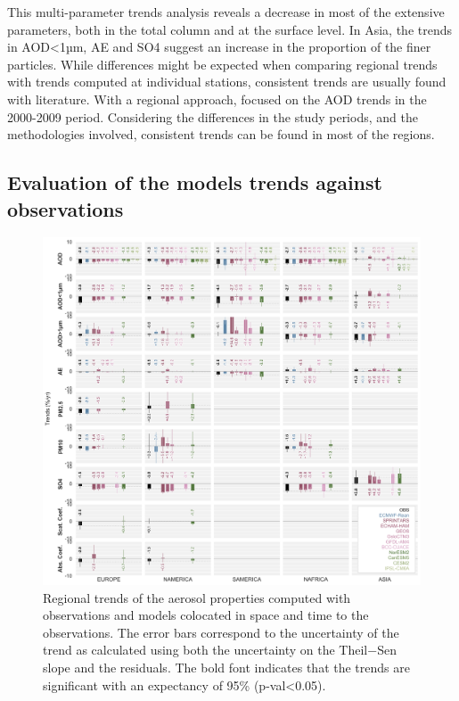 \documentclass[journal abbreviation, manuscript]{copernicus}
\begin{document}
\begin{itemize}
\end{itemize}

This multi-parameter trends analysis reveals a decrease in most of the extensive parameters, both in the total column and at the surface level. In Asia, the trends in AOD<1µm, AE and SO4 suggest an increase in the proportion of the finer particles. While differences might be expected when comparing regional trends with trends computed at individual stations, consistent trends are usually found with literature. With a regional approach, \cite{DEMEIJ201275} focused on the AOD trends in the 2000-2009 period. Considering the differences in the study periods, and the methodologies involved, consistent trends can be found in most of the regions.

\subsection{Evaluation of the models trends against observations}

\begin{figure}[t]
 \includegraphics[width=16cm]{../scripts/figs/heatmaps/BARS.png}
 \caption{Regional trends of the aerosol properties computed with observations and models colocated in space and time to the observations. The error bars correspond to the uncertainty of the trend as calculated using both the uncertainty on the Theil−Sen slope and the residuals. The bold font indicates that the trends are significant with an expectancy of 95\% (p-val<0.05).}
 \label{fig:bars}
\end{figure}
\end{document}
